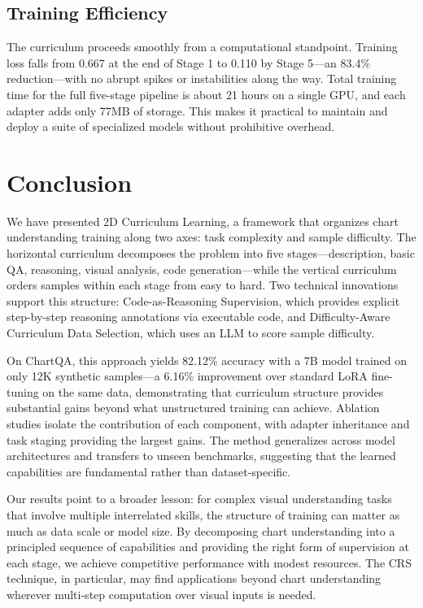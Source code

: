 \documentclass[journal]{IEEEtran}
\newcommand{\fullmethod}{2D Curriculum Learning}
\newcommand{\crs}{CRS}
\begin{document}
\subsection{Training Efficiency}
The curriculum proceeds smoothly from a computational standpoint. Training loss falls from 0.667 at the end of Stage 1 to 0.110 by Stage 5---an 83.4\% reduction---with no abrupt spikes or instabilities along the way. Total training time for the full five-stage pipeline is about 21 hours on a single GPU, and each adapter adds only 77MB of storage. This makes it practical to maintain and deploy a suite of specialized models without prohibitive overhead.

\section{Conclusion}
We have presented \fullmethod{}, a framework that organizes chart understanding training along two axes: task complexity and sample difficulty. The horizontal curriculum decomposes the problem into five stages---description, basic QA, reasoning, visual analysis, code generation---while the vertical curriculum orders samples within each stage from easy to hard. Two technical innovations support this structure: Code-as-Reasoning Supervision, which provides explicit step-by-step reasoning annotations via executable code, and Difficulty-Aware Curriculum Data Selection, which uses an LLM to score sample difficulty.

On ChartQA, this approach yields 82.12\% accuracy with a 7B model trained on only 12K synthetic samples---a 6.16\% improvement over standard LoRA fine-tuning on the same data, demonstrating that curriculum structure provides substantial gains beyond what unstructured training can achieve. Ablation studies isolate the contribution of each component, with adapter inheritance and task staging providing the largest gains. The method generalizes across model architectures and transfers to unseen benchmarks, suggesting that the learned capabilities are fundamental rather than dataset-specific.

Our results point to a broader lesson: for complex visual understanding tasks that involve multiple interrelated skills, the structure of training can matter as much as data scale or model size. By decomposing chart understanding into a principled sequence of capabilities and providing the right form of supervision at each stage, we achieve competitive performance with modest resources. The \crs{} technique, in particular, may find applications beyond chart understanding wherever multi-step computation over visual inputs is needed.
\end{document}
